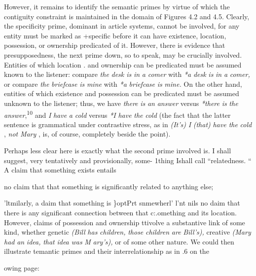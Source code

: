However, it remains to identify the semantic primes by virtue of which the contiguity constraint is maintained in the domain of Figures 4.2 and 4.5. Clearly, the specificity prime, dominant in article systems, cannot be involved, for any entity must be marked as +specific before it can have existence, location, possession, or ownership pre\-dicated of it. However, there is evidence that presupposedness, the next prime down, so to speak, may be crucially involved. Entities of which location . and ownership can be predicated must be assumed known to the listener: compare \textit{the} \textit{desk is} \textit{in} \textit{a} \textit{comer} with \textit{*a} \textit{desk} \textit{is} \textit{in} \textit{a} \textit{comer,} or compare \textit{the} \textit{briefcase} \textit{is} \textit{mine} with \textit{*a} \textit{briefcase} \textit{is} \textit{mine.} On the other hand, entities of which existence and possession can be predicated must be assumed unknown to the listener; thus, we have \textit{there} \textit{is} \textit{an} \textit{answer} versus \textit{*there} \textit{is} \textit{the} \textit{answer},\textsuperscript{1}\textsuperscript{0 }and \textit{I} \textit{have} \textit{a} \textit{cold} versus \textit{*I} \textit{have} \textit{the} \textit{cold} (the fact that the latter sentence is grammatical under contrastive stress, as in \textit{(It's)} \textit{I }\textit{(that)} \textit{have the} \textit{cold} , \textit{not} \textit{Mary} , is, of course, completely beside the point). 

Perhaps less clear here is exactly what the second prime in\-volved is. I shall suggest, very tentatively and provisionally, some- 1thing Ishall call ``relatedness. `` A claim that something exists entails

no claim that that something is significantly related to anything else;

'ltmilarly, a daim that something is \}optPrt snmewherl' l'nt nils no daim that there is any significant connection between that c:.ome\-thing and its location. However, claims of possession and ownership ttivolve a substantive link of some kind, whether genetic \textit{(Bill} \textit{has} \textit{children,} \textit{those} \textit{children} \textit{are} \textit{Bill's),} creative \textit{(Mary} \textit{had} \textit{an} \textit{idea,} \textit{that} \textit{idea} \textit{was} \textit{M} \textit{ary's),} or of some other nature. We could then illustrate temantic primes and their interrelationship as in .6 on the

owing page:

